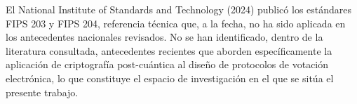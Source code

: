 El National Institute of Standards and Technology (2024) publicó los estándares FIPS 203 y FIPS 204, referencia técnica que, a la fecha, no ha sido aplicada en los antecedentes nacionales revisados. No se han identificado, dentro de la literatura consultada, antecedentes recientes que aborden específicamente la aplicación de criptografía post-cuántica al diseño de protocolos de votación electrónica, lo que constituye el espacio de investigación en el que se sitúa el presente trabajo.